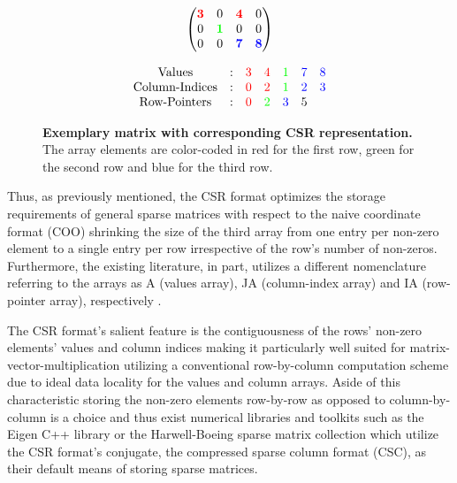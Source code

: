     \begin{figure}[ht]
      \centering
      \begin{minipage}{0.4\textwidth}
        \centering
        $$
        \begin{pmatrix}
          \color{red}{\bm{3}} &                     0 &  \color{red}{\bm{4}} &                    0 \\
                            0 & \color{green}{\bm{1}} &                    0 &                    0 \\
                            0 &                     0 & \color{blue}{\bm{7}} & \color{blue}{\bm{8}} \\
        \end{pmatrix}
        $$
      \end{minipage}
      \begin{minipage}{0.4\textwidth}
        \centering
        $$
        \begin{matrix}
          \text{Values}  & : & \color{red}{3} &   \color{red}{4} & \color{green}{1} & \color{blue}{7} & \color{blue}{8} \\
          \text{Column-Indices} & : & \color{red}{0} &   \color{red}{2} & \color{green}{1} & \color{blue}{2} & \color{blue}{3} \\
          \text{Row-Pointers} & : & \color{red}{0} & \color{green}{2} &  \color{blue}{3} &               5 &                 \\
        \end{matrix}
        $$
      \end{minipage}
      \caption[Exemplary matrix with corresponding CSR representation.]{\textbf{Exemplary matrix with corresponding CSR representation.} The array elements are color-coded in red for the first row, green for the second row and blue for the third row.}
      \label{fig:csr_example}
    \end{figure}

    Thus, as previously mentioned, the CSR format optimizes the storage requirements of general sparse matrices with
    respect to the naive coordinate format (COO) shrinking the size of the third array from one entry per non-zero
    element to a single entry per row irrespective of the row's number of non-zeros. Furthermore, the existing
    literature, in part, utilizes a different nomenclature referring to the arrays as A (values array), JA (column-index
    array) and IA (row-pointer array), respectively \cite{sparskit}.

    The CSR format's salient feature is the contiguousness of the rows' non-zero elements' values and column indices
    making it particularly well suited for matrix-vector-multiplication utilizing a conventional row-by-column
    computation scheme due to ideal data locality for the values and column arrays. Aside of this characteristic storing
    the non-zero elements row-by-row as opposed to column-by-column is a choice and thus exist numerical libraries and
    toolkits such as the Eigen C++ library \cite{eigen:website} or the Harwell-Boeing sparse matrix collection
    \cite{harwell-boeing} which utilize the CSR format's conjugate, the compressed sparse column format (CSC), as their
    default means of storing sparse matrices.

